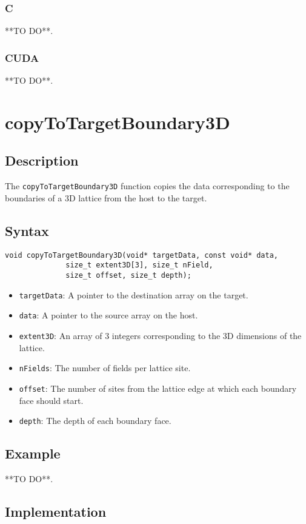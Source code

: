 \subsubsection{C}
**TO DO**.
\subsubsection{CUDA}
**TO DO**.


\newpage
\section{copyToTargetBoundary3D}

\subsection{Description}

The \verb+copyToTargetBoundary3D+ function copies the data corresponding to the boundaries of a 3D lattice from the host to the target.

\subsection{Syntax}
\begin{verbatim}
void copyToTargetBoundary3D(void* targetData, const void* data, 
              size_t extent3D[3], size_t nField, 
              size_t offset, size_t depth);
\end{verbatim}

\begin{itemize}
\item \verb+targetData+: A pointer to the destination array on the target.
\item \verb+data+: A pointer to the source array on the host.
\item \verb+extent3D+: An array of 3 integers corresponding to the 3D dimensions of the lattice.
\item \verb+nFields+: The number of fields per lattice site.
\item \verb+offset+: The number of sites from the lattice edge at which each boundary face should start.
\item \verb+depth+: The depth of each boundary face.
\end{itemize}


\subsection{Example}
**TO DO**.
\subsection{Implementation}
